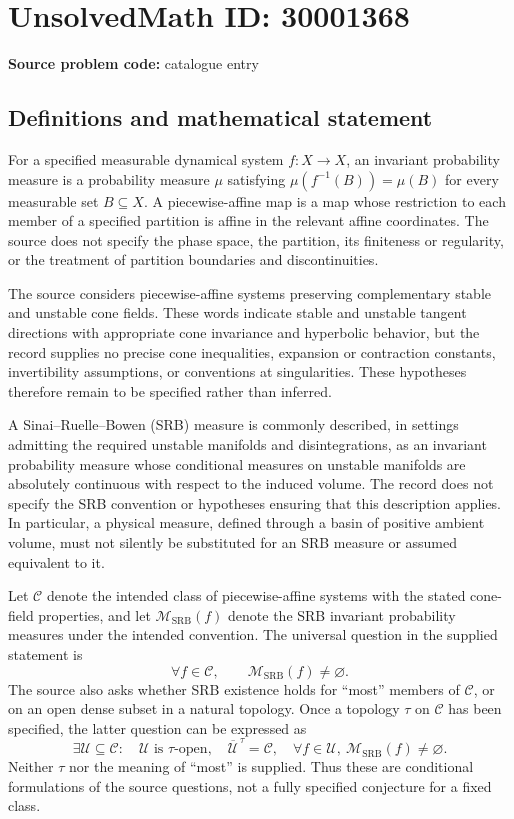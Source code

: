 \documentclass[11pt]{article}
\begin{document}
\section*{UnsolvedMath ID: 30001368}
\textbf{Source problem code:} catalogue entry
\subsection{Definitions and mathematical statement}
For a specified measurable dynamical system \(f\colon X\to X\), an invariant probability measure is a probability measure \(\mu\) satisfying \(\mu(f^{-1}(B))=\mu(B)\) for every measurable set \(B\subseteq X\). A piecewise-affine map is a map whose restriction to each member of a specified partition is affine in the relevant affine coordinates. The source does not specify the phase space, the partition, its finiteness or regularity, or the treatment of partition boundaries and discontinuities.

The source considers piecewise-affine systems preserving complementary stable and unstable cone fields. These words indicate stable and unstable tangent directions with appropriate cone invariance and hyperbolic behavior, but the record supplies no precise cone inequalities, expansion or contraction constants, invertibility assumptions, or conventions at singularities. These hypotheses therefore remain to be specified rather than inferred.

A Sinai--Ruelle--Bowen (SRB) measure is commonly described, in settings admitting the required unstable manifolds and disintegrations, as an invariant probability measure whose conditional measures on unstable manifolds are absolutely continuous with respect to the induced volume. The record does not specify the SRB convention or hypotheses ensuring that this description applies. In particular, a physical measure, defined through a basin of positive ambient volume, must not silently be substituted for an SRB measure or assumed equivalent to it.

Let \(\mathcal C\) denote the intended class of piecewise-affine systems with the stated cone-field properties, and let \(\mathcal M_{\mathrm{SRB}}(f)\) denote the SRB invariant probability measures under the intended convention. The universal question in the supplied statement is
\[
\forall f\in\mathcal C,\qquad \mathcal M_{\mathrm{SRB}}(f)\ne\varnothing.
\]
The source also asks whether SRB existence holds for ``most'' members of \(\mathcal C\), or on an open dense subset in a natural topology. Once a topology \(\tau\) on \(\mathcal C\) has been specified, the latter question can be expressed as
\[
\exists\mathcal U\subseteq\mathcal C:\quad
\mathcal U\text{ is }\tau\text{-open},\quad
\overline{\mathcal U}^{\,\tau}=\mathcal C,\quad
\forall f\in\mathcal U,\ \mathcal M_{\mathrm{SRB}}(f)\ne\varnothing.
\]
Neither \(\tau\) nor the meaning of ``most'' is supplied. Thus these are conditional formulations of the source questions, not a fully specified conjecture for a fixed class.
\end{document}
